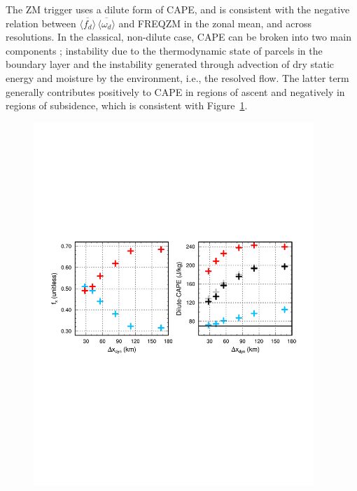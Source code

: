 {The ZM trigger uses a dilute form of CAPE, and is consistent with the negative relation between $\overline{\langle f_{d} \rangle} \, \overline{\langle \omega_{d} \rangle}$ and FREQZM in the zonal mean, and across resolutions. In the classical, non-dilute case, CAPE can be broken into two main components \citep{Z2002JGR}; instability due to the thermodynamic state of parcels in the boundary layer and the instability generated through advection of dry static energy and moisture by the environment, i.e., the resolved flow. The latter term generally contributes positively to CAPE in regions of ascent and negatively in regions of subsidence, which is consistent with Figure~\ref{fig:vomg}.

\begin{figure}[t]
\begin{center}
\noindent\includegraphics[width=25pc,angle=0]{chapter6/temp_cape.pdf}\\
\end{center}
\caption{}
\label{fig:vomg}
\end{figure}

}
